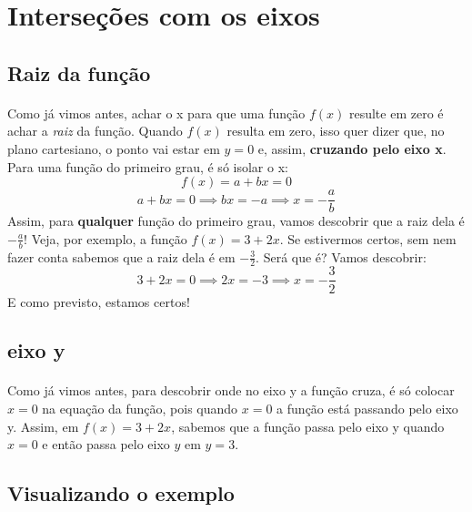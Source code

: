 \documentclass[11pt]{article}
\begin{document}
\section{Interseções com os eixos}
\subsection{Raiz da função}
\paragraph{}
Como já vimos antes, achar o x para que uma função $f(x)$ resulte em zero 
é achar a \emph{raiz} da função. Quando $f(x)$ resulta em zero, isso quer 
dizer que, no plano cartesiano, o ponto vai estar em $y=0$ e, assim, 
\textbf{cruzando pelo eixo x}. Para uma função do primeiro grau, é só isolar
o x:
$$f(x) = a + bx = 0$$
$$a + bx = 0 \implies bx = -a \implies x = -\frac{a}{b}$$
Assim, para \textbf{qualquer} função do primeiro grau, vamos descobrir que
a raiz dela é $-\frac{a}{b}$! Veja, por exemplo, a função $f(x) = 3 + 2x$.
Se estivermos certos, sem nem fazer conta sabemos que a raiz dela é em
$-\frac{3}{2}$. Será que é? Vamos descobrir:
$$3 + 2x = 0 \implies 2x = -3 \implies x = -\frac{3}{2}$$
E como previsto, estamos certos!
\subsection{eixo y}
\paragraph{}
Como já vimos antes, para descobrir onde no eixo y a função cruza, é só 
colocar $x=0$ na equação da função, pois quando $x=0$ a função está passando
pelo eixo y. Assim, em $f(x) = 3 + 2x$, sabemos que a função passa pelo eixo
y quando $x=0$ e então passa pelo eixo $y$ em $y = 3$.
\subsection{Visualizando o exemplo}
\end{document}
